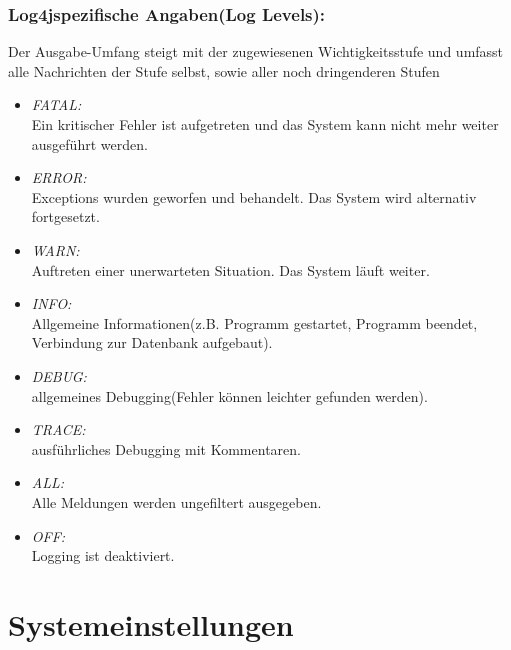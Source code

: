 \subsubsection{Log4jspezifische Angaben(Log Levels):}
Der Ausgabe-Umfang steigt mit der zugewiesenen Wichtigkeitsstufe und umfasst alle Nachrichten der Stufe selbst, sowie aller noch dringenderen Stufen
\begin{itemize}
	\item \emph{FATAL:}\\
	Ein kritischer Fehler ist aufgetreten und das System kann nicht mehr weiter ausgeführt werden.
	\item \emph{ERROR:}\\
	Exceptions wurden geworfen und behandelt. Das System wird alternativ fortgesetzt.
	\item \emph{WARN:}\\
	Auftreten einer unerwarteten Situation. Das System läuft weiter.
	\item \emph{INFO:}\\
	Allgemeine Informationen(z.B. Programm gestartet, Programm beendet, Verbindung zur Datenbank aufgebaut).
	\item \emph{DEBUG:}\\
	allgemeines Debugging(Fehler können leichter gefunden werden).
	\item \emph{TRACE:}\\
	ausführliches Debugging mit Kommentaren.
	\item \emph{ALL:}\\
	Alle Meldungen werden ungefiltert ausgegeben.
	\item \emph{OFF:}\\
	Logging ist deaktiviert.
\end{itemize}

\section{Systemeinstellungen}


